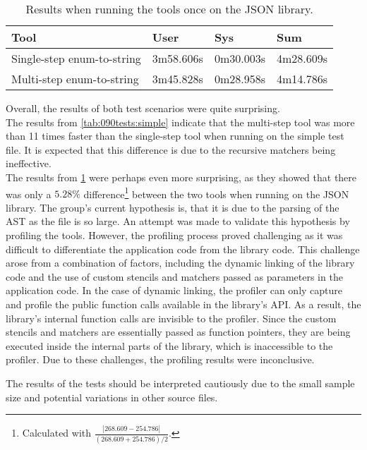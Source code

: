 \begin{table}[H]
    \centering
    \begin{tabular}{|p{}|p{}|p{}|p{}|}
    \hline
    \rowcolor{gray!30}
    \textbf{Tool} & \textbf{User} & \textbf{Sys} & \textbf{Sum} \\ \hline
    Single-step enum-to-string & 3m58.606s & 0m30.003s & 4m28.609s \\ \hline
    Multi-step enum-to-string & 3m45.828s & 0m28.958s & 4m14.786s\\ \hline
    \end{tabular}
    \caption{Results when running the tools once on the JSON library.}
    \label{tab:090tests:json}
\end{table}
\vspace*{-1em}

Overall, the results of both test scenarios were quite surprising.\\
The results from \cref{tab:090tests:simple} indicate that the multi-step tool was more than 11 times faster than the single-step tool when running on the simple test file. It is expected that this difference is due to the recursive matchers being ineffective.\\
The results from \cref{tab:090tests:json} were perhaps even more surprising, as they showed that there was only a $5.28\%$ difference\footnote{
    Calculated with $\frac{|268.609-254.786|}{(268.609+254.786)/2}$.
} between the two tools when running on the JSON library.
The group's current hypothesis is, that it is due to the parsing of the AST as the file is so large.
An attempt was made to validate this hypothesis by profiling the tools. However, the profiling process proved challenging as it was difficult to differentiate the application code from the library code.
This challenge arose from a combination of factors, including the dynamic linking of the library code and the use of custom stencils and matchers passed as parameters in the application code.
In the case of dynamic linking, the profiler can only capture and profile the public function calls available in the library's API.
As a result, the library's internal function calls are invisible to the profiler.
Since the custom stencils and matchers are essentially passed as function pointers, they are being executed inside the internal parts of the library, which is inaccessible to the profiler.
Due to these challenges, the profiling results were inconclusive. 

The results of the tests should be interpreted cautiously due to the small sample size and potential variations in other source files.

